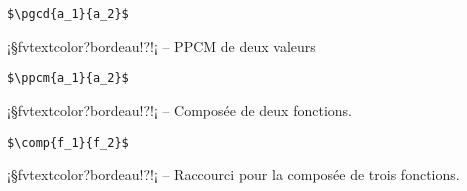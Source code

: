 \documentclass[11pt,a4paper,rgb]{report}
\begin{document}
\setlength{\leftskip}{.75cm}%
\setlength{\textwidth}{17.25cm}%

\colorbox{blue!15}{}
\hfill
\begin{minipage}{.65\textwidth}
	\begin{lstlisting}[linewidth=\textwidth, language={[LaTeX]TeX}]
	$\pgcd{a_1}{a_2}$
	\end{lstlisting}
\end{minipage}

\setlength{\leftskip}{0pt}
\setlength{\textwidth}{18cm}%


\vspace*{.75cm}

\inCodeStub¡§fvtextcolor?bordeau!?!¡ -- PPCM de deux valeurs

\setlength{\leftskip}{.75cm}%
\setlength{\textwidth}{17.25cm}%

\colorbox{blue!15}{}
\hfill
\begin{minipage}{.65\textwidth}
	\begin{lstlisting}[linewidth=\textwidth, language={[LaTeX]TeX}]
	$\ppcm{a_1}{a_2}$
	\end{lstlisting}
\end{minipage}

\setlength{\leftskip}{0pt}
\setlength{\textwidth}{18cm}%


\vspace*{.75cm}

\inCodeStub¡§fvtextcolor?bordeau!?!¡ -- Composée de deux fonctions.

\setlength{\leftskip}{.75cm}%
\setlength{\textwidth}{17.25cm}%

\colorbox{blue!15}{}
\hfill
\begin{minipage}{.65\textwidth}
	\begin{lstlisting}[linewidth=\textwidth, language={[LaTeX]TeX}]
	$\comp{f_1}{f_2}$
	\end{lstlisting}
\end{minipage}

\setlength{\leftskip}{0pt}
\setlength{\textwidth}{18cm}%


\vspace*{.75cm}

\inCodeStub¡§fvtextcolor?bordeau!?!¡ -- Raccourci pour la composée de trois fonctions.
\end{document}
